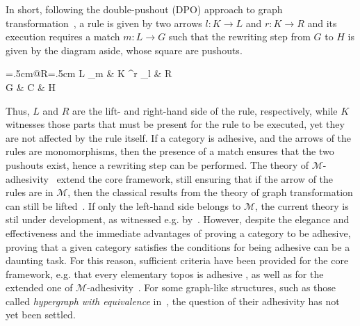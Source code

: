 \documentclass[a4paper,UKenglish,cleveref,pdftex,thm-restate,numberwithinsect]{lipics-v2021}
\begin{document}
\vspace{.1cm}
\noindent
\begin{minipage}[l]{.78\linewidth}In short, following the double-pushout (DPO) approach
to graph transformation~\cite{xxx}, a rule is given by two arrows $l: K \to L$ and $r: K \rightarrow R$
and its execution requires a match $m: L \to G$ such that the rewriting step from $G$
to $H$ is given by the diagram aside, whose square are pushouts.
  \end{minipage}%
    \hfill
  \begin{minipage}[r]{.20\linewidth }
    \xymatrix@C=.5cm@R=.5cm{
      L \ar[d]_{m}
      & K \ar[r]^r \ar[l]_{l} \ar[d] & R \ar [d] \\
      G & C \ar[r] \ar[l]                    & H
    }
  \end{minipage}
\vspace{.1cm}

\noindent
Thus, $L$ and $R$ are the lift- and right-hand side of the rule, respectively, while $K$ witnesses those parts that must 
be present for the rule to be executed, yet they are not affected by the rule itself.
%
If a category is adhesive, and the arrows of the rules are monomorphisms, then the presence of a match ensures that the
two pushouts exist, hence a rewriting step can be performed.
%
The theory of $\mathcal{M}$-adhesivity~\cite{xxx} extend the core framework, still ensuring that if the arrow 
of the rules are in $\mathcal{M}$,
then the classical results from the theory of graph 
transformation can still be lifted~\cite{xxx}. 
If only the left-hand side belongs to $\mathcal{M}$, the current theory is stil under development, as witnessed e.g.
by~\cite{BaldanC0G24}.
%
However, despite the elegance and effectiveness and the immediate advantages of proving a category 
to be adhesive, proving that a given category satisfies the conditions 
for being adhesive can be a daunting task. For this reason,  sufficient criteria have been provided for the core 
framework, e.g. that every elementary topos is adhesive \cite{lack2006toposes}, as well as for the extended one of
$\mathcal{M}$-adhesivity~\cite{CastelnovoGM24}.
%
For some graph-like structures, such as those called \emph{hypergraph with equivalence} in~\cite{concur2006}, the question 
of their adhesivity has not yet been settled.
\end{document}
